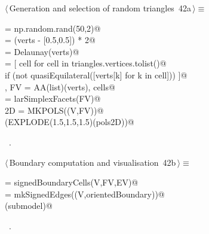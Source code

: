 \documentclass[11pt,oneside]{article}	%
\begin{document}
\begin{flushleft} \small \label{scrap89}
\protect{}$\langle\,$Generation and selection of random triangles\nobreak\ {\footnotesize 42a}$\,\rangle\equiv$
\vspace{-1ex}
\begin{list}{}{} \item
\mbox{}\verb@verts = np.random.rand(50,2)@\\
\mbox{}\verb@verts = (verts - [0.5,0.5]) * 2@\\
\mbox{}\verb@triangles = Delaunay(verts)@\\
\mbox{}\verb@cells = [ cell for cell in triangles.vertices.tolist()@\\
\mbox{}\verb@       if (not quasiEquilateral([verts[k] for k in cell])) ]@\\
\mbox{}\verb@V, FV = AA(list)(verts), cells@\\
\mbox{}\verb@EV = larSimplexFacets(FV)@\\
\mbox{}\verb@pols2D = MKPOLS((V,FV))@\\
\mbox{}\verb@VIEW(EXPLODE(1.5,1.5,1.5)(pols2D))@\\
\mbox{}\verb@@{\NWsep}
\end{list}
\vspace{-1ex}
\footnotesize\addtolength{\baselineskip}{-1ex}
\begin{list}{}{\setlength{\itemsep}{-\parsep}\setlength{\itemindent}{-\leftmargin}}
\item \NWtxtMacroRefIn\ .
\end{list}
\end{flushleft}

\begin{flushleft} \small \label{scrap90}
\protect{}$\langle\,$Boundary computation and visualisation\nobreak\ {\footnotesize 42b}$\,\rangle\equiv$
\vspace{-1ex}
\begin{list}{}{} \item
\mbox{}\verb@orientedBoundary = signedBoundaryCells(V,FV,EV)@\\
\mbox{}\verb@submodel = mkSignedEdges((V,orientedBoundary))@\\
\mbox{}\verb@VIEW(submodel)@\\
\mbox{}\verb@@{\NWsep}
\end{list}
\vspace{-1ex}
\footnotesize\addtolength{\baselineskip}{-1ex}
\begin{list}{}{\setlength{\itemsep}{-\parsep}\setlength{\itemindent}{-\leftmargin}}
\item \NWtxtMacroRefIn\ .
\end{list}
\end{flushleft}
\end{document}

